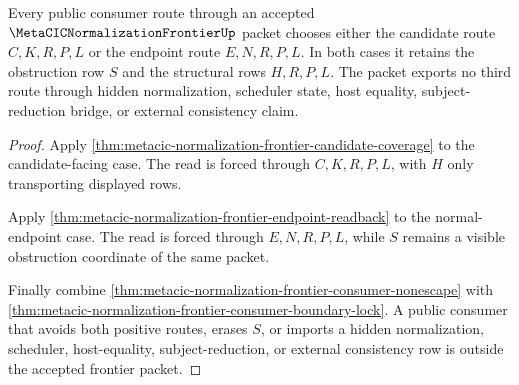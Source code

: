 \begin{theorem}
\label{thm:metacic-normalization-frontier-consumer-route-public-exhaustion}
Every public consumer route through an accepted
$\MetaCICNormalizationFrontierUp$ packet chooses either the candidate route
$C,K,R,P,L$ or the endpoint route $E,N,R,P,L$. In both cases it retains the
obstruction row $S$ and the structural rows $H,R,P,L$. The packet exports no
third route through hidden normalization, scheduler state, host equality,
subject-reduction bridge, or external consistency claim.
\end{theorem}
\begin{proof}
Apply \autoref{thm:metacic-normalization-frontier-candidate-coverage} to the
candidate-facing case. The read is forced through $C,K,R,P,L$, with $H$ only
transporting displayed rows.

Apply \autoref{thm:metacic-normalization-frontier-endpoint-readback} to the
normal-endpoint case. The read is forced through $E,N,R,P,L$, while $S$
remains a visible obstruction coordinate of the same packet.

Finally combine \autoref{thm:metacic-normalization-frontier-consumer-nonescape}
with \autoref{thm:metacic-normalization-frontier-consumer-boundary-lock}. A
public consumer that avoids both positive routes, erases $S$, or imports a
hidden normalization, scheduler, host-equality, subject-reduction, or external
consistency row is outside the accepted frontier packet.
\end{proof}
